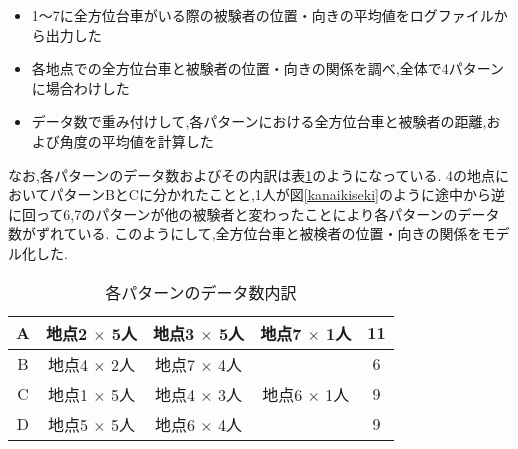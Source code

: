 \begin{itemize}
\item 1～7に全方位台車がいる際の被験者の位置・向きの平均値をログファイルから出力した
\item 各地点での全方位台車と被験者の位置・向きの関係を調べ,全体で4パターンに場合わけした
\item データ数で重み付けして,各パターンにおける全方位台車と被験者の距離,および角度の平均値を計算した
\end{itemize}

なお,各パターンのデータ数およびその内訳は表\ref{pattern}のようになっている.
4の地点においてパターンBとCに分かれたことと,1人が図\ref{kanaikiseki}のように途中から逆に回って6,7のパターンが他の被験者と変わったことにより各パターンのデータ数がずれている.
このようにして,全方位台車と被検者の位置・向きの関係をモデル化した.

\begin{comment}
\begin{figure}[!h]
\begin{center}
\texttt{[image: kanaikiseki.eps]}
\caption{他と違う動きをした被験者の軌跡}
\label{kanaikiseki}
\end{center}
\end{figure}
\end{comment}



\begin{table}
\begin{center}
\begin{tabular}{|c|c|c|c|c|}
\hline
A & 地点2 $\times$ 5人 & 地点3 $\times$ 5人 & 地点7 $\times$ 1人 & 11\\
\hline
B & 地点4 $\times$ 2人 & 地点7 $\times$ 4人 & & 6\\
\hline
C & 地点1 $\times$ 5人 & 地点4 $\times$ 3人 & 地点6 $\times$ 1人 & 9\\
\hline
D & 地点5 $\times$ 5人 & 地点6 $\times$ 4人 & & 9\\
\hline
\end{tabular}
\end{center}
\caption{各パターンのデータ数内訳}
\label{pattern}
\end{table}

\begin{comment}
\begin{figure}[htbp]
 \begin{minipage}{0.5\hsize}
\begin{center}
\texttt{[image: model1.eps]}
\caption{モデルA}
\label{model1}
\end{center}
 \end{minipage}
 \begin{minipage}{0.5\hsize}
\begin{center}
\texttt{[image: model2.eps]}
\caption{モデルB}
\label{model2}
\end{center}
 \end{minipage}
\end{figure}
\end{comment}

